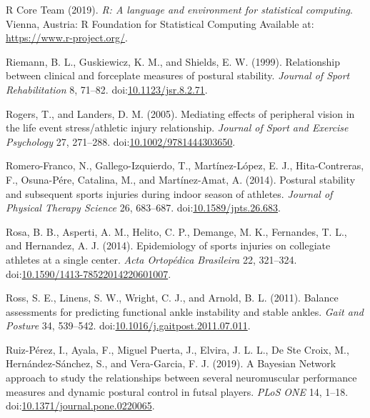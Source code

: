 \documentclass[
]{frontiersHLTH}
\newlength{\cslhangindent}
\newenvironment{cslreferences}%
  {\setlength{\parindent}{0pt}%
  \everypar{\setlength{\hangindent}{\cslhangindent}}\ignorespaces}%
  {\par}
\begin{document}
\begin{cslreferences}
\leavevmode\hypertarget{ref-RCoreTeam2019}{}%
R Core Team (2019). \emph{R: A language and environment for statistical
computing}. Vienna, Austria: R Foundation for Statistical Computing
Available at: \url{https://www.r-project.org/}.

\leavevmode\hypertarget{ref-Riemann1999d}{}%
Riemann, B. L., Guskiewicz, K. M., and Shields, E. W. (1999).
Relationship between clinical and forceplate measures of postural
stability. \emph{Journal of Sport Rehabilitation} 8, 71--82.
doi:\href{https://doi.org/10.1123/jsr.8.2.71}{10.1123/jsr.8.2.71}.

\leavevmode\hypertarget{ref-Rogers2005}{}%
Rogers, T., and Landers, D. M. (2005). Mediating effects of peripheral
vision in the life event stress/athletic injury relationship.
\emph{Journal of Sport and Exercise Psychology} 27, 271--288.
doi:\href{https://doi.org/10.1002/9781444303650}{10.1002/9781444303650}.

\leavevmode\hypertarget{ref-Romero-Franco2014}{}%
Romero-Franco, N., Gallego-Izquierdo, T., Martínez-López, E. J.,
Hita-Contreras, F., Osuna-Pére, Catalina, M., and Martínez-Amat, A.
(2014). Postural stability and subsequent sports injuries during indoor
season of athletes. \emph{Journal of Physical Therapy Science} 26,
683--687.
doi:\href{https://doi.org/10.1589/jpts.26.683}{10.1589/jpts.26.683}.

\leavevmode\hypertarget{ref-Rosa2014}{}%
Rosa, B. B., Asperti, A. M., Helito, C. P., Demange, M. K., Fernandes,
T. L., and Hernandez, A. J. (2014). Epidemiology of sports injuries on
collegiate athletes at a single center. \emph{Acta Ortopédica
Brasileira} 22, 321--324.
doi:\href{https://doi.org/10.1590/1413-78522014220601007}{10.1590/1413-78522014220601007}.

\leavevmode\hypertarget{ref-Ross2011}{}%
Ross, S. E., Linens, S. W., Wright, C. J., and Arnold, B. L. (2011).
Balance assessments for predicting functional ankle instability and
stable ankles. \emph{Gait and Posture} 34, 539--542.
doi:\href{https://doi.org/10.1016/j.gaitpost.2011.07.011}{10.1016/j.gaitpost.2011.07.011}.

\leavevmode\hypertarget{ref-Ruiz-Perez2019}{}%
Ruiz-Pérez, I., Ayala, F., Miguel Puerta, J., Elvira, J. L. L., De Ste
Croix, M., Hernández-Sánchez, S., and Vera-Garcia, F. J. (2019). A
Bayesian Network approach to study the relationships between several
neuromuscular performance measures and dynamic postural control in
futsal players. \emph{PLoS ONE} 14, 1--18.
doi:\href{https://doi.org/10.1371/journal.pone.0220065}{10.1371/journal.pone.0220065}.


\end{cslreferences}
\end{document}
